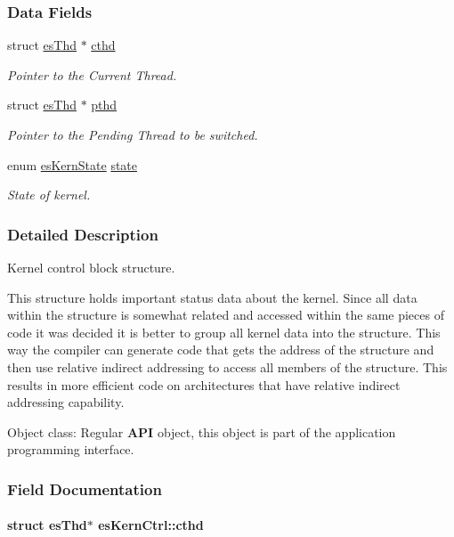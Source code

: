 \subsubsection*{Data Fields}
\begin{DoxyCompactItemize}
\item 
struct \hyperlink{structesThd}{es\-Thd} $\ast$ \hyperlink{structesKernCtrl_ad96202c654fe69e144b636fc50b36cbc}{cthd}
\begin{DoxyCompactList}\small\item\em Pointer to the Current Thread. \end{DoxyCompactList}\item 
struct \hyperlink{structesThd}{es\-Thd} $\ast$ \hyperlink{structesKernCtrl_a0c4ca292be0d70bfdf7f89a19ff49ca8}{pthd}
\begin{DoxyCompactList}\small\item\em Pointer to the Pending Thread to be switched. \end{DoxyCompactList}\item 
enum \hyperlink{group__kern__intf_gac9be6bfeddbd6af148cdb3867fbc24af}{es\-Kern\-State} \hyperlink{structesKernCtrl_a148e7bb788d355ad3799713fda612a4e}{state}
\begin{DoxyCompactList}\small\item\em State of kernel. \end{DoxyCompactList}\end{DoxyCompactItemize}


\subsubsection{Detailed Description}
Kernel control block structure. 

This structure holds important status data about the kernel. Since all data within the structure is somewhat related and accessed within the same pieces of code it was decided it is better to group all kernel data into the structure. This way the compiler can generate code that gets the address of the structure and then use relative indirect addressing to access all members of the structure. This results in more efficient code on architectures that have relative indirect addressing capability. \begin{DoxyParagraph}{Object class\-:}
Regular {\bfseries A\-P\-I} object, this object is part of the application programming interface. 
\end{DoxyParagraph}


\subsubsection{Field Documentation}
\hypertarget{structesKernCtrl_ad96202c654fe69e144b636fc50b36cbc}{
\paragraph[{cthd}]{\setlength{\rightskip}{0pt plus 5cm}struct {\bf es\-Thd}$\ast$ es\-Kern\-Ctrl\-::cthd}}\label{structesKernCtrl_ad96202c654fe69e144b636fc50b36cbc}


